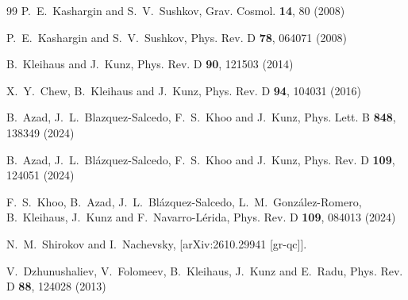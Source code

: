 \documentclass[aps,prl,reprint,superscriptaddress,nofootinbib,floatfix]{revtex4-2}
\begin{document}
\begin{thebibliography}{99}
P.~E.~Kashargin and S.~V.~Sushkov,
Grav. Cosmol. \textbf{14}, 80 (2008)

P.~E.~Kashargin and S.~V.~Sushkov,
Phys. Rev. D \textbf{78}, 064071 (2008)

B.~Kleihaus and J.~Kunz,
Phys. Rev. D \textbf{90}, 121503 (2014)

X.~Y.~Chew, B.~Kleihaus and J.~Kunz,
Phys. Rev. D \textbf{94}, 104031 (2016)

B.~Azad, J.~L.~Blazquez-Salcedo, F.~S.~Khoo and J.~Kunz,
Phys. Lett. B \textbf{848}, 138349 (2024)

B.~Azad, J.~L.~Bl{\'a}zquez-Salcedo, F.~S.~Khoo and J.~Kunz,
Phys. Rev. D \textbf{109}, 124051 (2024)

F.~S.~Khoo, B.~Azad, J.~L.~Bl{\'a}zquez-Salcedo, L.~M.~Gonz{\'a}lez-Romero, B.~Kleihaus, J.~Kunz and F.~Navarro-L{\'e}rida,
Phys. Rev. D \textbf{109}, 084013 (2024)

N.~M.~Shirokov and I.~Nachevsky,
[arXiv:2610.29941 [gr-qc]].

V.~Dzhunushaliev, V.~Folomeev, B.~Kleihaus, J.~Kunz and E.~Radu,
Phys. Rev. D \textbf{88}, 124028 (2013)


\end{thebibliography}
\end{document}
